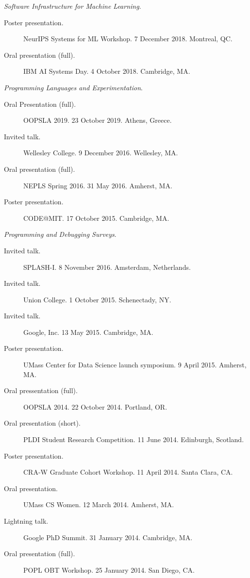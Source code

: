 \documentclass[10pt]{article}
\newcommand{\cvsec}[2]{
    \begin{tcolorbox}[width=\textwidth, breakable, title={#1}]
        #2
    \end{tcolorbox}
    \vspace{10pt}
}
\begin{document}
\cvsec{Talks and Presentations}{
  \emph{Software Infrastructure for Machine Learning}.
  \begin{description}
    \item[Poster presentation.] NeurIPS Systems for ML Workshop. 7 December 2018. Montreal, QC.
    \item[Oral presentation (full).] IBM AI Systems Day. 4 October 2018. Cambridge, MA.
  \end{description}
     \vspace{10pt}
    \emph{Programming Languages and Experimentation}.
    \begin{description}
      \item[Oral Presentation (full).] OOPSLA 2019. 23 October 2019. Athens, Greece.
      \item[Invited talk.] Wellesley College. 9 December 2016. Wellesley, MA.
      \item[Oral presentation (full).] NEPLS Spring 2016. 31 May 2016. Amherst, MA.
      \item[Poster presentation.] CODE@MIT. 17 October 2015. Cambridge, MA.
    \end{description}
    \vspace{10pt}
    \emph{Programming and Debugging Surveys}.
    \begin{description}
      \item[Invited talk.] SPLASH-I. 8 November 2016. Amsterdam, Netherlands.
      \item[Invited talk.] Union College. 1 October 2015. Schenectady, NY.
      \item[Invited talk.] Google, Inc. 13 May 2015. Cambridge, MA.
      \item[Poster presentation.] UMass Center for Data Science launch symposium. 9 April 2015. Amherst, MA.
      \item[Oral pressentation (full).] OOPSLA 2014. 22 October 2014. Portland, OR.
      \item[Oral presentation (short).] PLDI Student Research Competition. 11 June 2014. Edinburgh, Scotland.
      \item[Poster presentation.] CRA-W Graduate Cohort Workshop. 11 April 2014. Santa Clara, CA.
      \item[Oral presentation.] UMass CS Women. 12 March 2014. Amherst, MA.
      \item[Lightning talk.] Google PhD Summit. 31 January 2014. Cambridge, MA.
      \item[Oral presentation (full).]  POPL OBT Workshop. 25 January 2014. San Diego, CA.

\end{description}}
\end{document}
